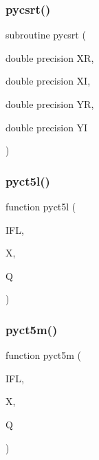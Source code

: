 \mbox{\label{pythia-6_84_824_8f_a26a8a92473a9eb985c72ec3c132f7b85}} 
\subsubsection{\texorpdfstring{pycsrt()}{pycsrt()}}
{\footnotesize\ttfamily subroutine pycsrt (\begin{DoxyParamCaption}\item[{double precision}]{XR,  }\item[{double precision}]{XI,  }\item[{double precision}]{YR,  }\item[{double precision}]{YI }\end{DoxyParamCaption})}

\mbox{\label{pythia-6_84_824_8f_a4f37f9344270ad52d136ebb5a849ad4e}} 
\subsubsection{\texorpdfstring{pyct5l()}{pyct5l()}}
{\footnotesize\ttfamily function pyct5l (\begin{DoxyParamCaption}\item[{}]{I\+FL,  }\item[{}]{X,  }\item[{}]{Q }\end{DoxyParamCaption})}

\mbox{\label{pythia-6_84_824_8f_a3ad7f72b08000107702cb296d607a0b9}} 
\subsubsection{\texorpdfstring{pyct5m()}{pyct5m()}}
{\footnotesize\ttfamily function pyct5m (\begin{DoxyParamCaption}\item[{}]{I\+FL,  }\item[{}]{X,  }\item[{}]{Q }\end{DoxyParamCaption})}

